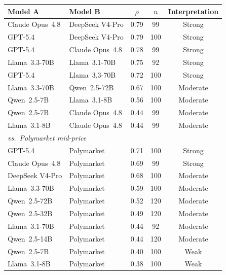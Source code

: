 \begin{center}
\begin{minipage}{\linewidth}
\centering
{}
\label{tab:rho-pairs}
\small
\begin{tabular}{llccc}
\toprule
\textbf{Model A} & \textbf{Model B} & $\rho$ & $n$ & \textbf{Interpretation} \\
\midrule
Claude Opus~4.8  & DeepSeek V4-Pro & 0.79 &  99 & Strong \\
GPT-5.4          & DeepSeek V4-Pro & 0.79 & 100 & Strong \\
GPT-5.4          & Claude Opus~4.8 & 0.78 &  99 & Strong \\
\midrule
Llama~3.3-70B    & Llama~3.1-70B   & 0.75 &  92 & Strong \\
GPT-5.4          & Llama~3.3-70B   & 0.72 & 100 & Strong \\
Llama~3.3-70B    & Qwen~2.5-72B    & 0.67 & 100 & Moderate \\
Qwen~2.5-7B      & Llama~3.1-8B    & 0.56 & 100 & Moderate \\
Qwen~2.5-7B      & Claude Opus~4.8 & 0.44 &  99 & Moderate \\
Llama~3.1-8B     & Claude Opus~4.8 & 0.44 &  99 & Moderate \\
\midrule
\multicolumn{5}{l}{\textit{vs.\ Polymarket mid-price}} \\
\midrule
GPT-5.4          & Polymarket & 0.71 & 100 & Strong \\
Claude Opus~4.8  & Polymarket & 0.69 &  99 & Strong \\
DeepSeek V4-Pro  & Polymarket & 0.68 & 100 & Moderate \\
Llama~3.3-70B    & Polymarket & 0.59 & 100 & Moderate \\
Qwen~2.5-72B     & Polymarket & 0.52 & 120 & Moderate \\
Qwen~2.5-32B     & Polymarket & 0.49 & 120 & Moderate \\
Llama~3.1-70B    & Polymarket & 0.44 &  92 & Moderate \\
Qwen~2.5-14B     & Polymarket & 0.44 & 120 & Moderate \\
Qwen~2.5-7B      & Polymarket & 0.40 & 100 & Weak \\
Llama~3.1-8B     & Polymarket & 0.38 & 100 & Weak \\
\bottomrule
\end{tabular}
\end{minipage}
\end{center}

